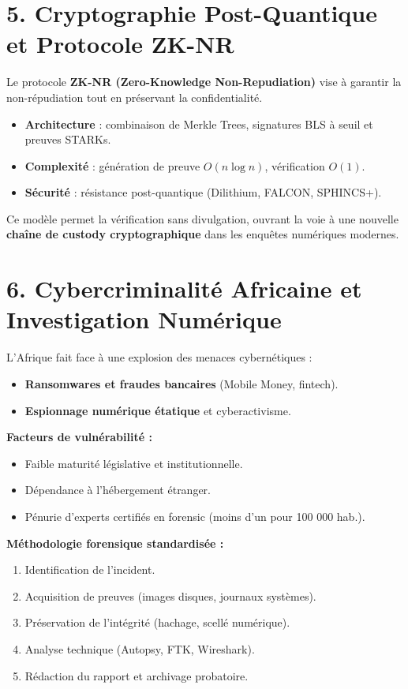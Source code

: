 \documentclass[12pt,a4paper]{article}
\begin{document}
\bigskip
\section*{5. Cryptographie Post-Quantique et Protocole ZK-NR}
Le protocole \textbf{ZK-NR (Zero-Knowledge Non-Repudiation)} vise à garantir la non-répudiation tout en préservant la confidentialité. 
\begin{itemize}[noitemsep]
  \item \textbf{Architecture} : combinaison de Merkle Trees, signatures BLS à seuil et preuves STARKs.
  \item \textbf{Complexité} : génération de preuve $O(n\log n)$, vérification $O(1)$.
  \item \textbf{Sécurité} : résistance post-quantique (Dilithium, FALCON, SPHINCS+).
\end{itemize}
Ce modèle permet la vérification sans divulgation, ouvrant la voie à une nouvelle \textbf{chaîne de custody cryptographique} dans les enquêtes numériques modernes.

\bigskip
\section*{6. Cybercriminalité Africaine et Investigation Numérique}
L’Afrique fait face à une explosion des menaces cybernétiques :
\begin{itemize}[noitemsep]
  \item \textbf{Ransomwares et fraudes bancaires} (Mobile Money, fintech).
  \item \textbf{Espionnage numérique étatique} et cyberactivisme.
\end{itemize}
\textbf{Facteurs de vulnérabilité :}
\begin{itemize}[noitemsep]
  \item Faible maturité législative et institutionnelle.
  \item Dépendance à l’hébergement étranger.
  \item Pénurie d’experts certifiés en forensic (moins d’un pour 100 000 hab.).
\end{itemize}
\textbf{Méthodologie forensique standardisée :}
\begin{enumerate}[noitemsep]
  \item Identification de l’incident.
  \item Acquisition de preuves (images disques, journaux systèmes).
  \item Préservation de l’intégrité (hachage, scellé numérique).
  \item Analyse technique (Autopsy, FTK, Wireshark).
  \item Rédaction du rapport et archivage probatoire.
\end{enumerate}
\end{document}
